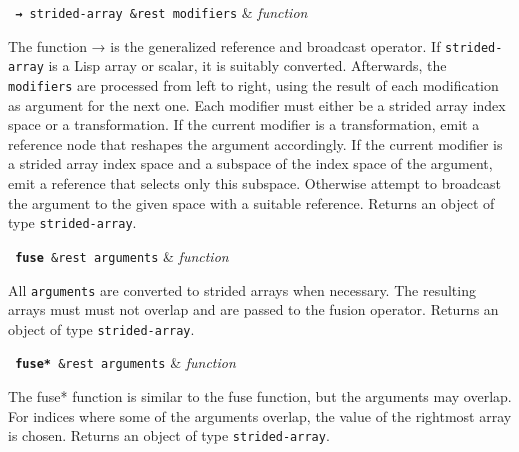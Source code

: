 \begin{function}
  \texttt{ \textbf{→} strided-array \&rest modifiers} & \textsl{function} \\
\end{function}

The function → is the generalized reference and broadcast operator. If
\texttt{strided-array} is a Lisp array or scalar, it is suitably converted.
Afterwards, the \texttt{modifiers} are processed from left to right, using
the result of each modification as argument for the next one. Each modifier
must either be a strided array index space or a transformation. If the
current modifier is a transformation, emit a reference node that reshapes
the argument accordingly.  If the current modifier is a strided array index
space and a subspace of the index space of the argument, emit a reference
that selects only this subspace. Otherwise attempt to broadcast the
argument to the given space with a suitable reference. Returns an object of
type \texttt{strided-array}.

\begin{function}
  \texttt{ \textbf{fuse} \&rest arguments} & \textsl{function} \\
\end{function}

All \texttt{arguments} are converted to strided arrays when necessary. The
resulting arrays must must not overlap and are passed to the fusion
operator. Returns an object of type \texttt{strided-array}.

\begin{function}
  \texttt{ \textbf{fuse*} \&rest arguments} & \textsl{function} \\
\end{function}

The fuse* function is similar to the fuse function, but the arguments may
overlap. For indices where some of the arguments overlap, the value of the
rightmost array is chosen. Returns an object of type
\texttt{strided-array}.
